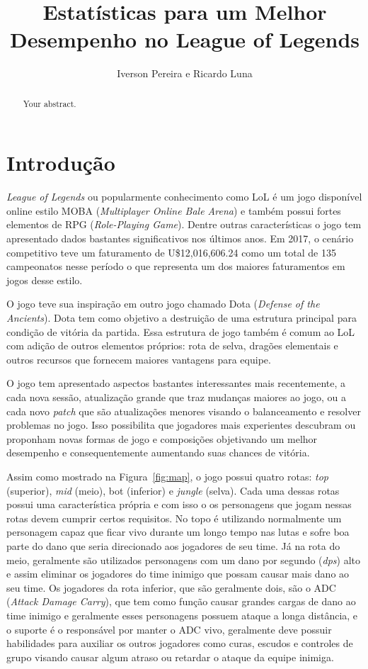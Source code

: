 \documentclass[a4paper]{article}
\title{Estatísticas para um Melhor Desempenho no League of Legends}
\author{Iverson Pereira e Ricardo Luna}
\begin{document}
\maketitle

\begin{abstract}
Your abstract.
\end{abstract}

\section{Introdução}

\textit{League of Legends} ou popularmente conhecimento como LoL é um jogo disponível online estilo MOBA (\textit{Multiplayer Online Bale Arena}) e também possui fortes elementos de RPG (\textit{Role-Playing Game}). Dentre outras características o jogo tem apresentado dados bastantes significativos nos últimos anos. Em 2017, o cenário competitivo teve um faturamento de U\$12,016,606.24 como um total de 135 campeonatos nesse período o que representa um dos maiores faturamentos em jogos desse estilo.  

O jogo teve sua inspiração em outro jogo chamado Dota (\textit{Defense of the Ancients}). Dota tem como objetivo a destruição de uma estrutura principal para condição de vitória da partida. Essa estrutura de jogo também é comum ao LoL com adição de outros elementos próprios: rota de selva, dragões elementais e outros recursos que fornecem maiores vantagens para equipe.  

O jogo tem apresentado aspectos bastantes interessantes mais recentemente, a cada nova sessão, atualização grande que traz mudanças maiores ao jogo, ou a cada novo \textit{patch} que são atualizações menores visando o balanceamento e resolver problemas no jogo. Isso possibilita que jogadores mais experientes descubram ou proponham novas formas de jogo e composições objetivando um melhor desempenho e consequentemente aumentando suas chances de vitória. 


Assim como mostrado na Figura~\ref{fig:map}, o jogo possui quatro rotas: \textit{top} (superior), \textit{mid} (meio), bot (inferior) e \textit{jungle} (selva). Cada uma dessas rotas possui uma característica própria e com isso o os personagens que jogam nessas rotas devem cumprir certos requisitos.  No topo é utilizando normalmente um personagem capaz que ficar vivo durante um longo tempo nas lutas e sofre boa parte do dano que seria direcionado aos jogadores de seu time. Já na rota do meio, geralmente são utilizados personagens com um dano por segundo (\textit{dps}) alto e assim eliminar os jogadores do time inimigo que possam causar mais dano ao seu time. Os jogadores da rota inferior, que são geralmente dois, são o ADC (\textit{Attack Damage Carry}), que tem como função causar grandes cargas de dano ao time inimigo e geralmente esses personagens possuem ataque a longa distância, e o suporte é o responsável por manter o ADC vivo, geralmente deve possuir habilidades para auxiliar os outros jogadores como curas, escudos e controles de grupo visando causar algum atraso ou retardar o ataque da equipe inimiga. 
\end{document}
